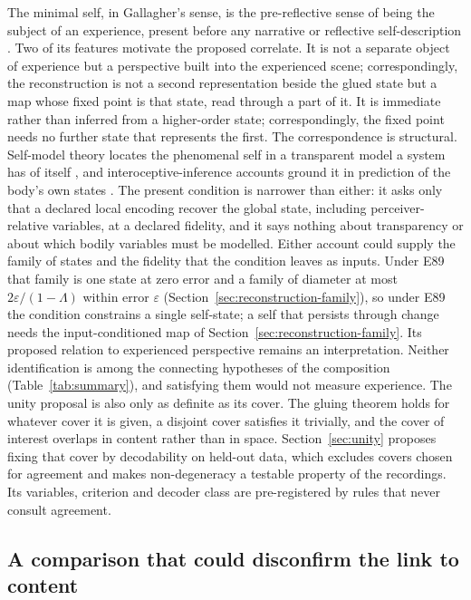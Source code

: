 \documentclass[12pt]{article}
\renewcommand{\cite}[1]{\citep{#1}}
\begin{document}
The minimal self, in Gallagher's sense, is the pre-reflective sense of being
the subject of an experience, present before any narrative or reflective
self-description \cite{gallagher2000}. Two of its features motivate the
proposed correlate. It is not a separate object of experience but a
perspective built into the experienced scene; correspondingly, the
reconstruction is not a second representation beside the glued state but a
map whose fixed point is that state, read through a part of it. It is
immediate rather than inferred from a higher-order state; correspondingly,
the fixed point needs no further state that represents the first. The
correspondence is structural. Self-model theory locates the phenomenal self in
a transparent model a system has of itself \cite{metzinger2003}, and
interoceptive-inference accounts ground it in prediction of the body's own
states \cite{seth2013}. The present condition is narrower than either: it asks
only that a declared local encoding recover the global state, including
perceiver-relative variables, at a declared fidelity, and it says nothing
about transparency or about which bodily variables must be modelled. Either
account could supply the family of states and the fidelity that the condition
leaves as inputs. Under E89 that family is one state at zero error and a
family of diameter at most $2\varepsilon/(1-\Lambda)$ within error $\varepsilon$
(Section~\ref{sec:reconstruction-family}), so under E89 the condition
constrains a single self-state; a self that persists through change needs the
input-conditioned map of Section~\ref{sec:reconstruction-family}. Its proposed relation to
experienced perspective remains an interpretation.
Neither identification is among the connecting hypotheses of the
composition (Table~\ref{tab:summary}), and satisfying them would not measure experience.
The unity proposal is also only as definite as its cover. The gluing theorem
holds for whatever cover it is given, a disjoint cover satisfies it trivially,
and the cover of interest overlaps in content rather than in space.
Section~\ref{sec:unity} proposes fixing that cover by decodability on held-out
data, which excludes covers chosen for agreement and makes non-degeneracy a
testable property of the recordings. Its variables, criterion and decoder class are pre-registered by rules that never consult agreement.

\subsection{A comparison that could disconfirm the link to content}
\label{sec:full-test}
\end{document}
